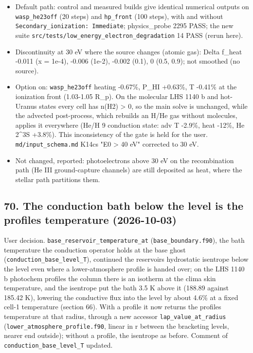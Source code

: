 \documentclass[english,a4paper]{my_memo}
\begin{document}
\begin{itemize}
  as F. Every state file now carries \texttt{lowE\_partition=F} when off.
\item
  Default path: control and measured builds give identical numerical
  outputs on \texttt{wasp\_he23off} (20 steps) and \texttt{hp\_front} (100 steps), with and
  without \texttt{Secondary\_ionization:\ Immediate}; physics\_probe 2295 PASS; the new
  suite \texttt{src/tests/low\_energy\_electron\_degradation} 14 PASS (rerun here).
\item
  Discontinuity at 30 eV where the source changes (atomic gas): Delta f\_heat
  -0.011 (x = 1e-4), -0.006 (1e-2), -0.002 (0.1), 0 (0.5, 0.9); not
  smoothed (no source).
\item
  Option on: \texttt{wasp\_he23off} heating -0.67\%, P\_HI +0.63\%, T -0.41\% at the
  ionization front (1.03-1.05 R\_p). On the molecular LHS 1140 b and
  hot-Uranus states every cell has n(H2) \textgreater{} 0, so the main solve is unchanged,
  while the advected post-process, which rebuilds an H/He gas without
  molecules, applies it everywhere (He/H 9 conduction state: adv T -2.9\%,
  heat -12\%, He 2\^{}3S +3.8\%). This inconsistency of the gate is held for the
  user. \texttt{md/input\_schema.md} K14c\textquotesingle s "E0 \textgreater{} 40 eV" corrected to 30 eV.
\item
  Not changed, reported: photoelectrons above 30 eV on the recombination path
  (He III ground-capture channels) are still deposited as heat, where the
  stellar path partitions them.
\end{itemize}

\subsection{70. The conduction bath below the level is the profile\textquotesingle s temperature (2026-10-03)}\label{70-the-conduction-bath-below-the-level-is-the-profiles-temperature-2026-10-03}

User decision. \texttt{base\_reservoir\_temperature\_at} (\texttt{base\_boundary.f90}), the
bath temperature the conduction operator holds at the base ghost
(\texttt{conduction\_base\_level\_T}), continued the reservoir\textquotesingle s hydrostatic isentrope
below the level even where a lower-atmosphere profile is handed over; on
the LHS 1140 b photochem profiles the column there is an isotherm at the
clima skin temperature, and the isentrope put the bath 3.5 K above it
(188.89 against 185.42 K), lowering the conductive flux into the level by
about 4.6\% at a fixed cell-1 temperature (section 66). With a profile it now
returns the profile\textquotesingle s temperature at that radius, through a new accessor
\texttt{lap\_value\_at\_radius} (\texttt{lower\_atmosphere\_profile.f90}, linear in r between
the bracketing levels, nearer end outside); without a profile, the
isentrope as before. Comment of \texttt{conduction\_base\_level\_T} updated.
\end{document}
